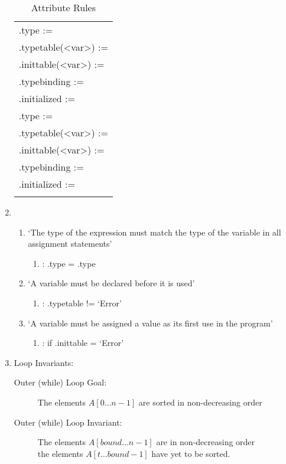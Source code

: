 \documentclass{article}
\begin{document}
\begin{enumerate}
\begin{longtable}[t]{P{1}}
.type := \\
.typetable(<var>) := \\
.inittable(<var>) := \\
.typebinding := \\
.initialized := \\

.type := \\
.typetable(<var>) := \\
.inittable(<var>) := \\
.typebinding := \\
.initialized := \\
\caption{Attribute Rules}
\end{longtable}

\item \begin{enumerate}
    \renewcommand\theenumiii{\arabic{enumiii}}
    \item `The type of the expression must match the type of the variable in all assignment statements'\\ \begin{enumerate}
        \item {}: .type = .type
        \end{enumerate}
    \item `A variable must be declared before it is used'\\ \begin{enumerate}
        \item {}: .typetable != `Error'
        \end{enumerate}
    \item `A variable must be assigned a value as its first use in the program'\\ \begin{enumerate}
        \item {}: if .inittable = `Error' %
        \end{enumerate}
    \end{enumerate}
\item Loop Invariants: 
    \begin{description}
    \item [Outer (while) Loop Goal:] The elements $A[0\dots n-1]$ are sorted in non-decreasing order
    \item [Outer (while) Loop Invariant:] The elements $A[bound \dots n-1]$ are in non-decreasing order \et\\
                                          the elements $A[t\dots bound-1]$ have yet to be sorted.
                                          

\end{description}
\end{enumerate}
\end{document}
